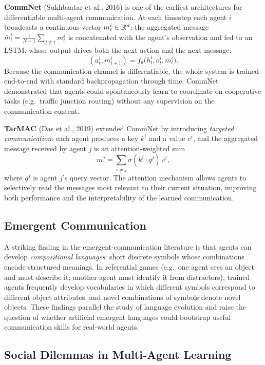 \textbf{CommNet} (Sukhbaatar et al., 2016)
is one of the earliest architectures for differentiable multi-agent
communication. At each timestep each agent $i$ broadcasts a
continuous vector $m^i_t \in \mathbb{R}^d$; the aggregated message
$\bar{m}^i_t = \frac{1}{N-1}\sum_{j \neq i} m^j_t$ is concatenated
with the agent's observation and fed to an LSTM, whose
output drives both the next action and the next message:
\[
  (a^i_t, m^i_{t+1}) = f_\theta\!\bigl(h^i_t, o^i_t, \bar{m}^i_t\bigr).
\]
Because the communication channel is differentiable, the whole
system is trained end-to-end with standard backpropagation through
time. CommNet demonstrated that agents could spontaneously learn to
coordinate on cooperative tasks (e.g.\ traffic junction routing)
without any supervision on the communication content.

\textbf{TarMAC} (Das et al., 2019) extended
CommNet by introducing \emph{targeted communication}: each agent
produces a key $k^i$ and a value $v^i$, and the aggregated message
received by agent $j$ is an attention-weighted sum
\[
  m^j = \sum_{i \neq j} \sigma(k^i \cdot q^j)\, v^i,
\]
where $q^j$ is agent $j$'s query vector. The attention mechanism
allows agents to selectively read the messages most relevant to their
current situation, improving both performance and the
interpretability of the learned communication.

\subsection{Emergent Communication}

A striking finding in the emergent-communication literature is that
agents can develop \emph{compositional languages}: short discrete symbols whose combinations
encode structured meanings. In referential games
(e.g.\ one agent sees an object and must describe it; another agent
must identify it from distractors), trained agents frequently develop
vocabularies in which different symbols correspond to different object
attributes, and novel combinations of symbols denote novel objects.
These findings parallel the study of language evolution and raise the
question of whether artificial emergent languages could bootstrap
useful communication skills for real-world agents.

\subsection{Social Dilemmas in Multi-Agent Learning}

